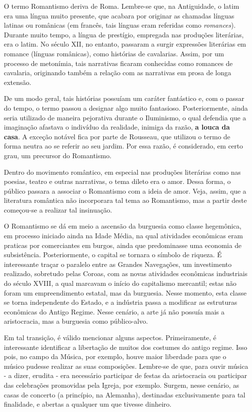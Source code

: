 O termo Romantismo deriva de Roma. Lembre-se que, na Antiguidade, o latim era uma língua muito presente, que acabara por originar as chamadas línguas latinas ou românicas (em francês, tais línguas eram referidas como \textit{romances}). Durante muito tempo, a língua de prestígio, empregada nas produções literárias, era o latim. No século XII, no entanto, passaram a surgir expressões literárias em romance (línguas românicas), como histórias de cavalarias. Assim, por um processo de metonímia, tais narrativas ficaram conhecidas como romances de cavalaria, originando também a relação com as narrativas em prosa de longa extensão.

De um modo geral, tais histórias possuíam um caráter fantástico e, com o passar do tempo, o termo passou a designar algo muito fantasioso. Posteriormente, ainda seria utilizado de maneira pejorativa durante o Iluminismo, o qual defendia que a imaginação afastava o indivíduo da realidade, inimiga da razão, \textbf{a louca da casa}. A exceção notável fica por parte de Rousseau, que utilizou o termo de forma neutra ao se referir ao seu jardim. Por essa razão, é considerado, em certo grau, um precursor do Romantismo.

Dentro do movimento romântico, em especial nas produções literárias como nas poesias, teatro e outras narrativas, o tema dileto era o amor. Dessa forma, o público passara a associar o Romantismo com a ideia de amor. Veja, assim, que a literatura romântica não incorporara tal tema ao Romantismo, mas a partir deste começou-se a realizar tal insinuação.

O Romantismo se dá em meio a ascensão da burguesia como classe hegemônica, em processo iniciado ainda na Idade Média, na qual atividades econômicas eram praticas por comerciantes em burgos, ainda que predominasse uma economia de subsistência. Posteriormente, o capital se tornara o símbolo de riqueza. É interessante traçar o paralelo entre as Grandes Navegações, um investimento realizado, sobretudo pelas Coroas, com as novas atividades econômicas industriais do século XVIII, a qual marcavam o início do capitalismo mercantil; estas não foram um empreendimento estatal, mas da burguesia. Nesse momento, esta classe se torna independente do Estado, e a indústria passa a modificar as estruturas econômicas do Antigo Regime. Nesse cenário, a arte já não possuía mais a aristocracia, mas a burguesia como público-alvo.

Em tal transição, é válido mencionar alguns aspectos. Primeiramente, é interessante identificar a libertação de muitos dos costumes do antigo regime. Isso pois, no campo da Música, por exemplo, houve maior liberdade para que o músico pudesse realizar as suas composições. Lembre-se de que, para ouvir música - a dizer, erudita - era necessário participar de festas da aristocracia ou participar das celebrações promovidas pela Igreja, por exemplo. Surgem, nesse cenário, as casas de concerto (a princípio, na Alemanha), destinadas exclusivamente para tal finalidade, e abertas a qualquer um que tivesse dinheiro.

